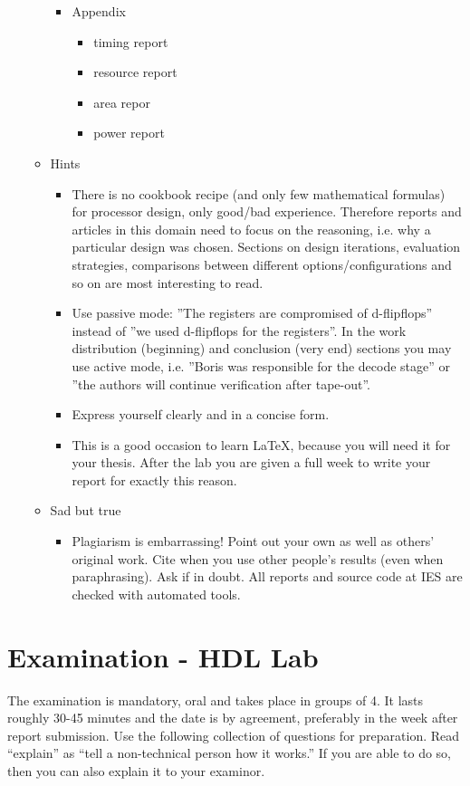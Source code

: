 \begin{enumerate}
\begin{itemize}
\begin{itemize}
			\item Appendix
				\begin{itemize}
				\item timing report
				\item resource report
				\item area repor
				\item power report
				\end{itemize}
			\end{itemize}
		\item Hints
			\begin{itemize}
			\item There is no cookbook recipe (and only few mathematical formulas) for processor design, only good/bad experience. Therefore reports and articles in this domain need to focus on the reasoning, i.e. why a particular design was chosen. Sections on design iterations, evaluation strategies, comparisons between different options/configurations and so on are most interesting to read. 
			\item Use passive mode: ''The registers are compromised of d-flipflops'' instead of  ''we used d-flipflops for the registers''. In the work distribution (beginning) and conclusion (very end) sections you may use active mode, i.e. ''Boris was responsible for the decode stage'' or ''the authors will continue verification after tape-out''.
			\item Express yourself clearly and in a concise form.					
			\item This is a good occasion to learn \LaTeX, because you will need it for your thesis. After the lab you are given a full week to write your report for exactly this reason.
			\end{itemize}
		\item Sad but true
		\begin{itemize}
			\item Plagiarism is embarrassing! Point out your own as well as others' original work. Cite when you use other people's results (even when paraphrasing). Ask if in doubt. All reports and source code at IES are checked with automated tools.
			\end{itemize}
	\end{itemize}
\end{enumerate}

\newpage
\section{Examination - HDL Lab}
The examination is mandatory, oral and takes place in groups of 4. It lasts roughly 30-45 minutes and the date is by agreement, preferably in the week after report submission. Use the following collection of questions for preparation. Read ``explain'' as ``tell a non-technical person how it works.'' If you are able to do so, then you can also explain it to your examinor.

